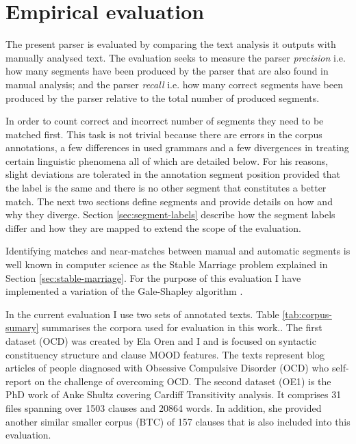 \chapter{Empirical evaluation}
\label{ch:evaluation}

The present parser is evaluated by comparing the text analysis it outputs with manually analysed text. The evaluation seeks to measure the parser \textit{precision} i.e. how many segments have been produced by the parser that are also found in manual analysis; and the parser \textit{recall} i.e. how many correct segments have been produced by the parser relative to the total number of produced segments.

In order to count correct and incorrect number of segments they need to be matched first. This task is not trivial because there are errors in the corpus annotations, a few differences in used grammars and a few divergences in treating certain linguistic phenomena all of which are detailed below. For his reasons, slight deviations are tolerated in the annotation segment position provided that the label is the same and there is no other segment that constitutes a better match. The next two sections define segments and provide details on how and why they diverge. Section \ref{sec:segment-labels} describe how the segment labels differ and how they are mapped to extend the scope of the evaluation. 

Identifying matches and near-matches between manual and automatic segments is well known in computer science as the Stable Marriage problem explained in Section \ref{sec:stable-marriage}. For the purpose of this evaluation I have implemented a variation of the Gale-Shapley algorithm \citep{Gale1962}. %

In the current evaluation I use two sets of annotated texts. Table \ref{tab:corpus-sumary} summarises the corpora used for evaluation in this work.. The first dataset (OCD) was created by Ela Oren and I and is focused on syntactic constituency structure and clause MOOD features. The texts represent blog articles of people diagnosed with Obsessive Compulsive Disorder (OCD) who self-report on the challenge of overcoming OCD. 
The second dataset (OE1) is the PhD work of Anke Shultz covering Cardiff Transitivity analysis. It comprises 31 files spanning over 1503 clauses and 20864 words. In addition, she provided another similar smaller corpus (BTC) of 157 clauses that is also included into this evaluation. 

